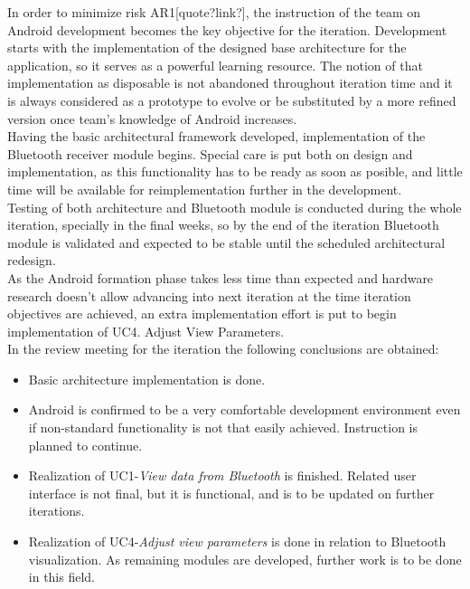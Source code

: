 			In order to minimize risk AR1[quote?link?], the instruction of the team on Android development becomes the key objective for the iteration. Development starts with the implementation of the designed base architecture for the application, so it serves as a powerful learning resource. The notion of that implementation as disposable is not abandoned throughout iteration time and it is always considered as a prototype to evolve or be substituted by a more refined version once team's knowledge of Android increases.\\

			Having the basic architectural framework developed, implementation of the Bluetooth receiver module begins. Special care is put both on design and implementation, as this functionality has to be ready as soon as posible, and little time will be available for reimplementation further in the development.\\

			Testing of both architecture and Bluetooth module is conducted during the whole iteration, specially in the final weeks, so by the end of the iteration Bluetooth module is validated and expected to be stable until the scheduled architectural redesign.\\

			As the Android formation phase takes less time than expected and hardware research doesn't allow advancing into next iteration at the time iteration objectives are achieved, an extra implementation effort is put to begin implementation of UC4. Adjust View Parameters.\\

			In the review meeting for the iteration the following conclusions are obtained:
			\begin{itemize}
				\item Basic architecture implementation is done.
				\item Android is confirmed to be a very comfortable development environment even if non-standard functionality is not that easily achieved. Instruction is planned to continue.
				\item Realization of UC1-\emph{View data from Bluetooth} is finished. Related user interface is not final, but it is functional, and is to be updated on further iterations.
				\item Realization of UC4-\emph{Adjust view parameters} is done in relation to Bluetooth visualization. As remaining modules are developed, further work is to be done in this field.
			\end{itemize}

